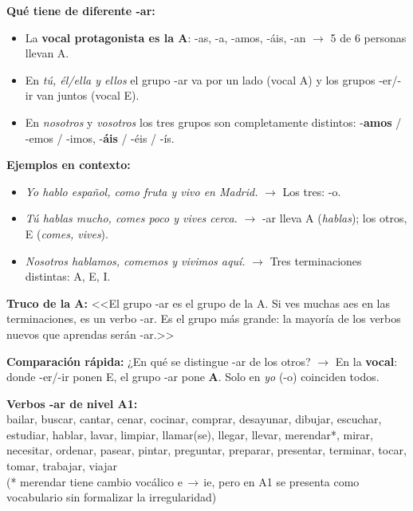\documentclass[a4paper,10pt]{article}
\begin{document}
\textbf{Qué tiene de diferente -ar:}
\begin{itemize}[nosep, leftmargin=1.2em]
\item La \textbf{vocal protagonista es la A}: -as, -a, -amos, -áis, -an $\to$ 5 de 6 personas llevan A.
\item En \textit{tú, él/ella y ellos} el grupo -ar va por un lado (vocal A) y los grupos -er/-ir van juntos (vocal E).
\item En \textit{nosotros} y \textit{vosotros} los tres grupos son completamente distintos: -\textbf{amos} / -emos / -imos, -\textbf{áis} / -éis / -ís.
\end{itemize}

\textbf{Ejemplos en contexto:}
\begin{itemize}[nosep, leftmargin=1.2em]
\item \textit{Yo hablo español, como fruta y vivo en Madrid.} $\to$ Los tres: -o.
\item \textit{Tú hablas mucho, comes poco y vives cerca.} $\to$ -ar lleva A (\textit{hablas}); los otros, E (\textit{comes, vives}).
\item \textit{Nosotros hablamos, comemos y vivimos aquí.} $\to$ Tres terminaciones distintas: A, E, I.
\end{itemize}

\begin{trucoconjugacion}
\textbf{Truco de la A:} <<El grupo -ar es el grupo de la A. Si ves muchas aes en las terminaciones, es un verbo -ar. Es el grupo más grande: la mayoría de los verbos nuevos que aprendas serán -ar.>>
\end{trucoconjugacion}

\begin{tcolorbox}[colback=tealconj!5, colframe=tealconj!40, boxrule=0.5pt, left=4pt, right=4pt, top=3pt, bottom=3pt]
\textbf{Comparación rápida:} ¿En qué se distingue -ar de los otros? $\to$ En la \textbf{vocal}: donde -er/-ir ponen E, el grupo -ar pone \textbf{A}. Solo en \textit{yo} (-o) coinciden todos.
\end{tcolorbox}

\vspace{4pt}
\textbf{Verbos -ar de nivel A1:}\\
{\footnotesize bailar, buscar, cantar, cenar, cocinar, comprar, desayunar, dibujar, escuchar, estudiar, hablar, lavar, limpiar, llamar(se), llegar, llevar, merendar*, mirar, necesitar, ordenar, pasear, pintar, preguntar, preparar, presentar, terminar, tocar, tomar, trabajar, viajar}\\
{\scriptsize (* merendar tiene cambio vocálico e\,$\to$\,ie, pero en A1 se presenta como vocabulario sin formalizar la irregularidad)}
\end{document}
